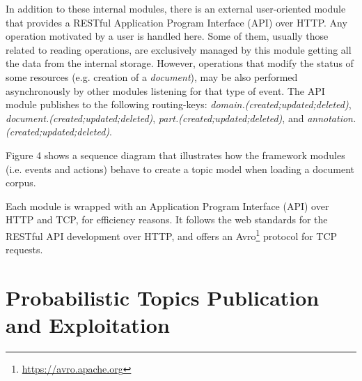 In addition to these internal modules, there is an external user-oriented module that provides a RESTful Application Program Interface (API) over HTTP. Any operation motivated by a user is handled here. Some of them, usually those related to reading operations, are exclusively managed by this module getting all the data from the internal storage. However, operations that modify the status of some resources (e.g. creation of a \textit{document}), may be also performed asynchronously by other modules listening for that type of event. The API module publishes to the following routing-keys: \textit{domain.(created;updated;deleted)}, \textit{document.(created;updated;deleted)}, \textit{part.(created;updated;deleted)}, and \textit{annotation.(created;updated;deleted)}.

Figure 4 shows a sequence diagram that illustrates how the framework modules (i.e. events and actions) behave to create a topic model when loading a document corpus. 


Each module is wrapped with an Application Program Interface (API) over HTTP and TCP, for efficiency reasons. It follows the web standards for the RESTful API development over HTTP, and offers an Avro\footnote{\url{https://avro.apache.org}} protocol for TCP requests.  



\section{Probabilistic Topics Publication and Exploitation}







